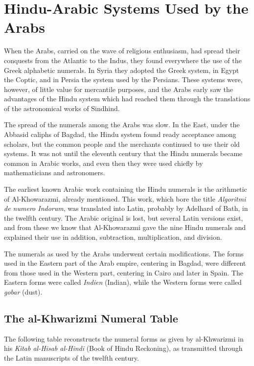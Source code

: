 \documentclass[11pt,a4paper]{article}
\begin{document}
\newpage

\section{Hindu-Arabic Systems Used by the Arabs}\label{ch:arab-systems}

When the Arabs, carried on the wave of religious enthusiasm, had spread their conquests from the Atlantic to the Indus, they found everywhere the use of the Greek alphabetic numerals. In Syria they adopted the Greek system, in Egypt the Coptic, and in Persia the system used by the Persians. These systems were, however, of little value for mercantile purposes, and the Arabs early saw the advantages of the Hindu system which had reached them through the translations of the astronomical works of Sindhind.

The spread of the numerals among the Arabs was slow. In the East, under the Abbasid caliphs of Bagdad, the Hindu system found ready acceptance among scholars, but the common people and the merchants continued to use their old systems. It was not until the eleventh century that the Hindu numerals became common in Arabic works, and even then they were used chiefly by mathematicians and astronomers.

The earliest known Arabic work containing the Hindu numerals is the arithmetic of Al-Khowarazmi, already mentioned. This work, which bore the title \textit{Algoritmi de numero Indorum}, was translated into Latin, probably by Adelhard of Bath, in the twelfth century. The Arabic original is lost, but several Latin versions exist, and from these we know that Al-Khowarazmi gave the nine Hindu numerals and explained their use in addition, subtraction, multiplication, and division.

The numerals as used by the Arabs underwent certain modifications. The forms used in the Eastern part of the Arab empire, centering in Bagdad, were different from those used in the Western part, centering in Cairo and later in Spain. The Eastern forms were called \textit{Indien} (Indian), while the Western forms were called \textit{gobar} (dust).

\subsection*{The al-Khwarizmi Numeral Table}

The following table reconstructs the numeral forms as given by al-Khwarizmi in his \textit{Kitab al-Hisab al-Hindi} (Book of Hindu Reckoning), as transmitted through the Latin manuscripts of the twelfth century.
\end{document}
